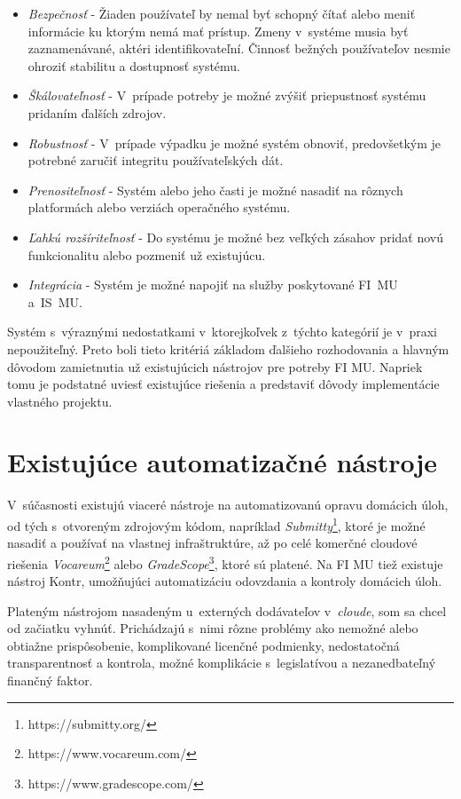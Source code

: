 \documentclass[
  digital, %
  oneside, %
  table,   %
  lof,     %
  lot,   %
]{fithesis3}
\begin{document}
\begin{itemize}
    \item \textit{Bezpečnosť} - Žiaden používateľ by nemal byť schopný čítať alebo meniť informácie ku ktorým nemá mať prístup. Zmeny v~systéme musia byť zaznamenávané, aktéri identifikovateľní. Činnosť bežných používateľov nesmie ohroziť stabilitu a dostupnosť systému.
    \item \textit{Škálovateľnosť} - V~prípade potreby je možné zvýšiť priepustnosť systému pridaním ďalších zdrojov.
    \item \textit{Robustnosť} - V~prípade výpadku je možné systém obnoviť, predovšetkým je potrebné zaručiť integritu používateľských dát.  
    \item \textit{Prenositeľnosť} - Systém alebo jeho časti je možné nasadiť na rôznych platformách alebo verziách operačného systému.
    \item \textit{Ľahkú rozšíriteľnosť} - Do systému je možné bez veľkých zásahov pridať novú funkcionalitu alebo pozmeniť už existujúcu.
    \item \textit{Integrácia} - Systém je možné napojiť na služby poskytované FI~MU a~IS~MU.
\end{itemize}

Systém s~výraznými nedostatkami v~ktorejkoľvek z~týchto kategórií je v~praxi nepoužiteľný. Preto boli tieto kritériá základom ďalšieho rozhodovania a hlavným dôvodom zamietnutia už existujúcich nástrojov pre potreby FI MU. Napriek tomu je podstatné uviesť existujúce riešenia a predstaviť dôvody implementácie vlastného projektu.

\section{Existujúce automatizačné nástroje}

V~súčasnosti existujú viaceré nástroje na automatizovanú opravu domácich úloh, od tých s~otvoreným zdrojovým kódom, napríklad  \textit{Submitty}\footnote{https://submitty.org/}, ktoré je možné nasadiť a používať na vlastnej infraštruktúre, až po celé komerčné cloudové riešenia \textit{Vocareum}\footnote{https://www.vocareum.com/} alebo \textit{GradeScope}\footnote{https://www.gradescope.com/}, ktoré sú platené. Na FI MU tiež existuje nástroj Kontr, umožňujúci automatizáciu odovzdania a kontroly domácich úloh.

Plateným nástrojom nasadeným u~externých dodávateľov v~\emph{cloude}, som sa chcel od začiatku vyhnúť. Prichádzajú s~nimi rôzne problémy ako nemožné alebo obtiažne prispôsobenie, komplikované licenčné podmienky, nedostatočná transparentnosť a kontrola, možné komplikácie s~legislatívou a nezanedbateľný finančný faktor.
\end{document}
